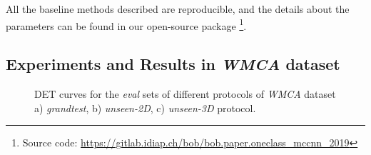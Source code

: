 \documentclass[journal]{IEEEtran}
\begin{document}
All the baseline methods described are reproducible, and the details about the parameters can be found in our open-source package \footnote{Source code: \url{https://gitlab.idiap.ch/bob/bob.paper.oneclass_mccnn_2019}}.


\subsection{Experiments and Results in \textit{WMCA} dataset}


\begin{figure*}[h!]
\centering
  \hfil
  \hfil
  \caption{DET curves for the \textit{eval} sets of different protocols of \textit{WMCA} dataset a) \textit{grandtest}, b) \textit{unseen-2D}, c) \textit{unseen-3D} protocol.}
 \label{fig:ROC}
\end{figure*}



\begin{table*}[h!]
\centering
\caption{Performance of the baseline systems and the proposed method in \textit{grandtest} protocol of \textit{WMCA} dataset. The values reported are obtained with a threshold computed for BPCER 1\% in  set.}
\label{tab:grandtest}
\end{table*}
\end{document}

